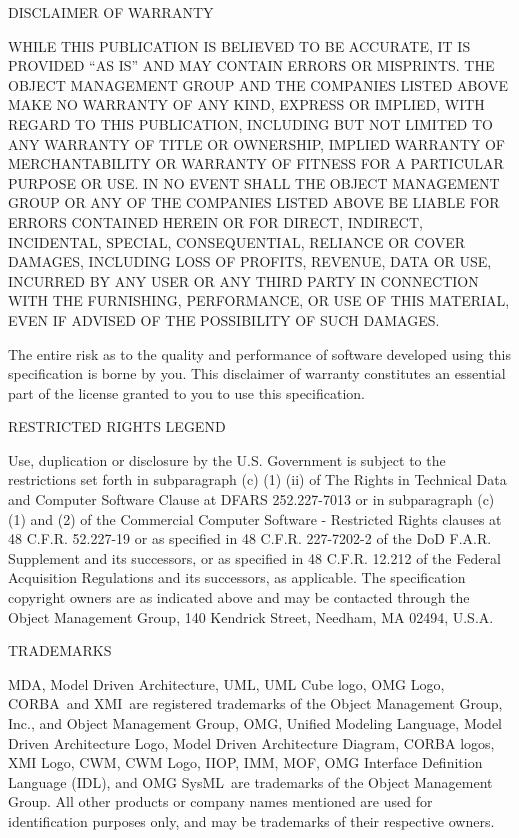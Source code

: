\documentclass[10pt,%
\ifpretendfinal
final%
\else
draft%
\fi,
]{scrreprt}
\newcommand{\rtm}[0]{\small{\textregistered\xspace}}
\newcommand{\OMGparagraph}[1]{
\vspace{3pt}
{\centerline {#1}}
\vspace{3pt}
}
\begin{document}
\OMGparagraph{DISCLAIMER OF WARRANTY}
WHILE THIS PUBLICATION IS BELIEVED TO BE ACCURATE, IT IS PROVIDED ``AS IS'' AND MAY CONTAIN ERRORS OR MISPRINTS. THE OBJECT MANAGEMENT GROUP AND THE COMPANIES LISTED ABOVE MAKE NO WARRANTY OF ANY KIND, EXPRESS OR IMPLIED, WITH REGARD TO THIS PUBLICATION, INCLUDING BUT NOT LIMITED TO ANY WARRANTY OF TITLE OR OWNERSHIP, IMPLIED WARRANTY OF MERCHANTABILITY OR WARRANTY OF FITNESS FOR A PARTICULAR PURPOSE OR USE.  IN NO EVENT SHALL THE OBJECT MANAGEMENT GROUP OR ANY OF THE COMPANIES LISTED ABOVE BE LIABLE FOR ERRORS CONTAINED HEREIN OR FOR DIRECT, INDIRECT, INCIDENTAL, SPECIAL, CONSEQUENTIAL, RELIANCE OR COVER DAMAGES, INCLUDING LOSS OF PROFITS, REVENUE, DATA OR USE, INCURRED BY ANY USER OR ANY THIRD PARTY IN CONNECTION WITH THE FURNISHING, PERFORMANCE, OR USE OF THIS MATERIAL, EVEN IF ADVISED OF THE POSSIBILITY OF SUCH DAMAGES. 

The entire risk as to the quality and performance of software developed using this specification is borne by you. This disclaimer of warranty constitutes an essential part of the license granted to you to use this specification.

\OMGparagraph{RESTRICTED RIGHTS LEGEND}
Use, duplication or disclosure by the U.S. Government  is subject to the restrictions set forth in subparagraph (c) (1) (ii) of The Rights in Technical Data and Computer Software Clause at DFARS 252.227-7013 or in subparagraph (c)(1) and (2) of the Commercial Computer Software - Restricted Rights clauses at 48 C.F.R. 52.227-19 or as specified in 48 C.F.R. 227-7202-2 of the DoD F.A.R. Supplement and its successors, or as specified in 48 C.F.R. 12.212 of the Federal Acquisition Regulations and its successors, as applicable. The specification copyright owners are as indicated above and may be contacted through the Object Management Group, 140 Kendrick Street, Needham, MA 02494, U.S.A.

\OMGparagraph{TRADEMARKS}
MDA\rtm, Model Driven Architecture\rtm, UML\rtm, UML Cube logo\rtm, OMG Logo\rtm, CORBA\rtm\ and XMI\rtm\ are registered trademarks of the Object Management Group, Inc., and Object Management Group\texttrademark\xspace, OMG\texttrademark\xspace , Unified Modeling Language\texttrademark\xspace, Model Driven Architecture Logo\texttrademark\xspace, Model Driven Architecture Diagram\texttrademark\xspace, CORBA logos\texttrademark\xspace, XMI Logo\texttrademark\xspace, CWM\texttrademark\xspace, CWM Logo\texttrademark\xspace, IIOP\texttrademark\xspace , IMM\texttrademark\xspace , MOF\texttrademark\xspace , OMG Interface Definition Language (IDL)\texttrademark\xspace , and OMG  SysML\texttrademark\xspace\   are trademarks of the Object Management Group. All other products or company names mentioned are used for identification purposes only, and may be trademarks of their respective owners.
\end{document}
